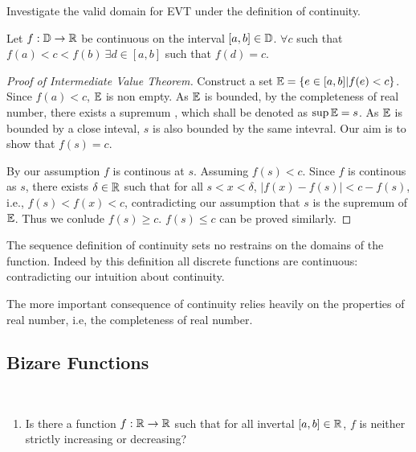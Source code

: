 \documentclass[../note.tex]{subfiles}
\begin{document}
\begin{hypothesis}
	Investigate the valid domain for EVT under the definition of continuity. 
\end{hypothesis}

\begin{theorem}
	Let $f: \mathbb{D} \rightarrow \mathbb{R}$ be continuous on the interval $[a,b]\in \mathbb{D}$. $\forall c $ such that $f(a)<c<f(b)\ \exists d \in [a,b] $ such that $ f(d) = c$.  
\end{theorem}

\begin{proof}[Proof of Intermediate Value Theorem]
	Construct a set $\mathbb{E} = \{e\in [a,b]| f(e)<c\}$. Since $f(a)<c$, $\mathbb{E}$ is non empty.  
	As $\mathbb{E}$ is bounded, by the completeness of real number, there exists a supremum , which shall be denoted as $\sup{\mathbb{E}}=s$. 
	As $\mathbb{E}$ is bounded by a close inteval, $s$ is also bounded by the same intevral. Our aim is to show that $f(s)=c$.

	By our assumption $f$ is continous at $s$. Assuming $f(s) < c$. 
	Since $f$ is continous as $s$, there exists $\delta \in \mathbb{R}$ such that for all $s<x<\delta$, $|f(x)-f(s)|<c-f(s)$, i.e., $f(s)<f(x)<c$, contradicting our assumption that $s$ is the supremum of $\mathbb{E}$. 
	Thus we conlude $f(s)\geq c$. $f(s)\leq c$ can be proved similarly.
\end{proof}

\begin{remark}
	The sequence definition of continuity sets no restrains on the domains of the function. Indeed by this definition all discrete functions are continuous: contradicting our intuition about continuity.
	
	The more important consequence of continuity relies heavily on the properties of real number, i.e, the completeness of real number.
\end{remark}

\subsection{Bizare Functions}
\begin{hypothesis}
	\ 
\begin{enumerate}
	\item Is there a function $f: \mathbb{R} \rightarrow \mathbb{R}$ such that for all invertal $[a,b] \in \mathbb{R}$, $f$ is neither strictly increasing or decreasing? 

\end{enumerate}
\end{hypothesis}
\end{document}

